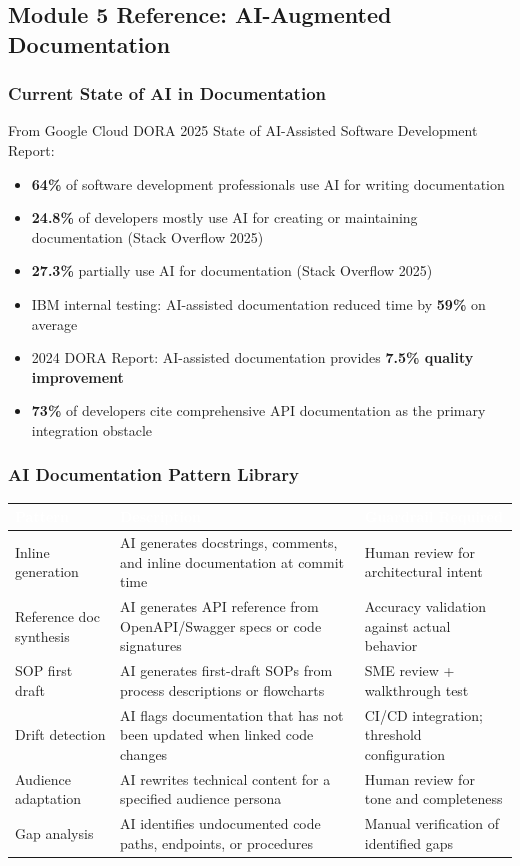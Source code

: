 \documentclass[11pt,letterpaper]{article}
\newcommand{\tableheader}[1]{\textbf{\sffamily\textcolor{white}{#1}}}
\begin{document}
\subsection{Module 5 Reference: AI-Augmented Documentation}

\subsubsection{Current State of AI in Documentation}

From Google Cloud DORA 2025 State of AI-Assisted Software Development Report:
\begin{itemize}[leftmargin=*]
  \item \textbf{64\%} of software development professionals use AI for writing documentation
  \item \textbf{24.8\%} of developers mostly use AI for creating or maintaining documentation (Stack Overflow 2025)
  \item \textbf{27.3\%} partially use AI for documentation (Stack Overflow 2025)
  \item IBM internal testing: AI-assisted documentation reduced time by \textbf{59\%} on average
  \item 2024 DORA Report: AI-assisted documentation provides \textbf{7.5\% quality improvement}
  \item \textbf{73\%} of developers cite comprehensive API documentation as the primary integration obstacle
\end{itemize}

\subsubsection{AI Documentation Pattern Library}

\begin{center}
\begin{tabularx}{\textwidth}{L{3.5cm}XL{3cm}}
\toprule
{}
\tableheader{Pattern} & \tableheader{Description} & \tableheader{Guardrail Required} \\
\midrule
Inline generation & AI generates docstrings, comments, and inline documentation at commit time & Human review for architectural intent \\
Reference doc synthesis & AI generates API reference from OpenAPI/Swagger specs or code signatures & Accuracy validation against actual behavior \\
SOP first draft & AI generates first-draft SOPs from process descriptions or flowcharts & SME review + walkthrough test \\
Drift detection & AI flags documentation that has not been updated when linked code changes & CI/CD integration; threshold configuration \\
Audience adaptation & AI rewrites technical content for a specified audience persona & Human review for tone and completeness \\
Gap analysis & AI identifies undocumented code paths, endpoints, or procedures & Manual verification of identified gaps \\
\bottomrule
\end{tabularx}
\end{center}
\end{document}

